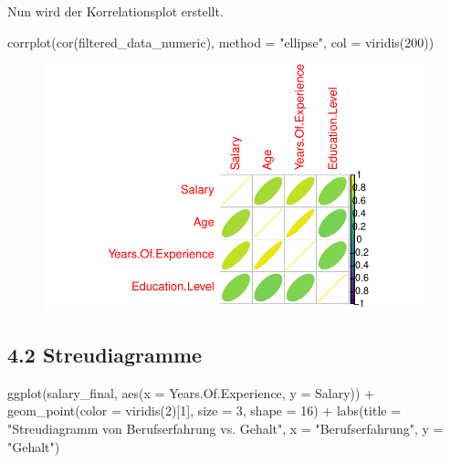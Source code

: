\documentclass[
  letterpaper,
  DIV=11,
  numbers=noendperiod]{scrartcl}
\newenvironment{Shaded}{\begin{snugshade}}{\end{snugshade}}
\newcommand{\AttributeTok}[1]{\textcolor[rgb]{0.40,0.45,0.13}{#1}}
\newcommand{\DecValTok}[1]{\textcolor[rgb]{0.68,0.00,0.00}{#1}}
\newcommand{\FunctionTok}[1]{\textcolor[rgb]{0.28,0.35,0.67}{#1}}
\newcommand{\NormalTok}[1]{\textcolor[rgb]{0.00,0.23,0.31}{#1}}
\newcommand{\SpecialCharTok}[1]{\textcolor[rgb]{0.37,0.37,0.37}{#1}}
\newcommand{\StringTok}[1]{\textcolor[rgb]{0.13,0.47,0.30}{#1}}
\begin{document}
Nun wird der Korrelationsplot erstellt.

\begin{Shaded}
\begin{Highlighting}[]
\FunctionTok{corrplot}\NormalTok{(}\FunctionTok{cor}\NormalTok{(filtered\_data\_numeric), }\AttributeTok{method =} \StringTok{"ellipse"}\NormalTok{, }\AttributeTok{col =} \FunctionTok{viridis}\NormalTok{(}\DecValTok{200}\NormalTok{))}
\end{Highlighting}
\end{Shaded}

\begin{figure}[H]

{\centering \includegraphics{main_doc_files/figure-pdf/unnamed-chunk-27-1.pdf}

}

\end{figure}

\hypertarget{streudiagramme}{%
\subsection{4.2 Streudiagramme}\label{streudiagramme}}

\begin{Shaded}
\begin{Highlighting}[]
\FunctionTok{ggplot}\NormalTok{(salary\_final, }\FunctionTok{aes}\NormalTok{(}\AttributeTok{x =}\NormalTok{ Years.Of.Experience, }\AttributeTok{y =}\NormalTok{ Salary)) }\SpecialCharTok{+}
  \FunctionTok{geom\_point}\NormalTok{(}\AttributeTok{color =} \FunctionTok{viridis}\NormalTok{(}\DecValTok{2}\NormalTok{)[}\DecValTok{1}\NormalTok{], }\AttributeTok{size =} \DecValTok{3}\NormalTok{, }\AttributeTok{shape =} \DecValTok{16}\NormalTok{) }\SpecialCharTok{+}
  \FunctionTok{labs}\NormalTok{(}\AttributeTok{title =} \StringTok{"Streudiagramm von Berufserfahrung vs. Gehalt"}\NormalTok{,}
       \AttributeTok{x =} \StringTok{"Berufserfahrung"}\NormalTok{,}
       \AttributeTok{y =} \StringTok{"Gehalt"}\NormalTok{)}
\end{Highlighting}
\end{Shaded}
\end{document}
